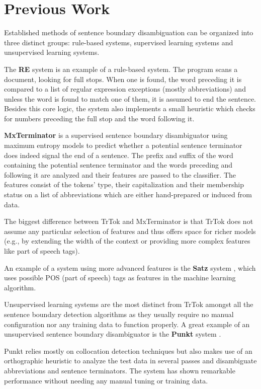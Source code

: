 \section{Previous Work}
\label{sec:previous-work}

Established methods of sentence boundary disambiguation can be
organized into three distinct groups: rule-based systems, supervised
learning systems and unsupervised learning systems.

The \textbf{RE} system \cite{sbd-re} is an example of a rule-based
system. The program scans a document, looking for full stops. When one
is found, the word preceding it is compared to a list of regular
expression exceptions (mostly abbreviations) and unless the word is
found to match one of them, it is assumed to end the sentence. Besides
this core logic, the system also implements a small heuristic which
checks for numbers preceding the full stop and the word following it.

\textbf{MxTerminator} \cite{sbd-mxterm} is a supervised sentence
boundary disambiguator using maximum entropy models to predict whether
a potential sentence terminator does indeed signal the end of a
sentence. The prefix and suffix of the word containing the potential
sentence terminator and the words preceding and following it are
analyzed and their features are passed to the classifier. The features
consist of the tokens' type, their capitalization and their membership
status on a list of abbreviations which are either hand-prepared or
induced from data.

The biggest difference between TrTok and MxTerminator is that TrTok
does not assume any particular selection of features and thus offers
space for richer models (e.g., by extending the width of the context
or providing more complex features like part of speech tags).

An example of a system using more advanced features is the
\textbf{Satz} system \cite{sbd-satz}, which uses possible POS (part of
speech) tags as features in the machine learning algorithm.

Unsupervised learning systems are the most distinct from TrTok amongst
all the sentence boundary detection algorithms as they usually require
no manual configuration nor any training data to function properly. A
great example of an unsupervised sentence boundary disambiguator is
the \textbf{Punkt} system \cite{sbd-punkt}.

Punkt relies mostly on collocation detection techniques but also makes
use of an orthographic heuristic to analyze the test data in several
passes and disambiguate abbreviations and sentence terminators. The
system has shown remarkable performance without needing any manual
tuning or training data.
